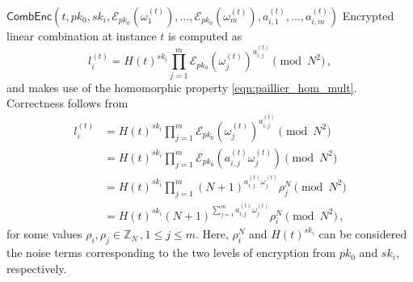 \documentclass[10pt,letterpaper,oneside,twocolumn,journal]{IEEEtran}
\theoremstyle{definition}
\theoremstyle{definition}
\theoremstyle{remark}
\newcommand\shrtdots{\!...}
\begin{document}
\begin{LaTeXdescription}
    \item[$\mathsf{CombEnc}(t, pk_0, sk_i, \mathcal{E}_{pk_0}(\omega_1^{(t)}),\shrtdots,\mathcal{E}_{pk_0}(\omega_m^{(t)}), a^{(t)}_{i,1},\shrtdots,a^{(t)}_{i,m})$] Encrypted linear combination at instance $t$ is computed as 
    \begin{equation}
        l^{(t)}_i = H(t)^{sk_i}\prod^{m}_{j=1}\mathcal{E}_{pk_0}(\omega^{(t)}_j)^{a^{(t)}_{i,j}} \pmod{N^2}\,,\label{eqn:our_scheme_lin_comb}
    \end{equation}
    and makes use of the homomorphic property \eqref{eqn:paillier_hom_mult}. Correctness follows from
    \begin{equation*}
        \begin{split}
             l^{(t)}_i &= H(t)^{sk_i}\prod^{m}_{j=1}\mathcal{E}_{pk_0}(\omega^{(t)}_j)^{a^{(t)}_{i,j}} \pmod{N^2} \\
            &= H(t)^{sk_i}\prod^{m}_{j=1}\mathcal{E}_{pk_0}(a^{(t)}_{i,j}\omega^{(t)}_j) \pmod{N^2} \\
            &= H(t)^{sk_i}\prod^{m}_{j=1}(N+1)^{a^{(t)}_{i,j}\omega^{(t)}_j} \rho^{N}_{j} \pmod{N^2} \\
            &= H(t)^{sk_i}(N+1)^{\sum^{m}_{j=1}a^{(t)}_{i,j}\omega^{(t)}_j} \rho_{i}^{N} \pmod{N^2}\,,
        \end{split}
    \end{equation*}
    for some values $\rho_i,\rho_j \in \mathbb{Z}_N\,,1\leq j \leq m$. Here, $\rho_i^N$ and $H(t)^{sk_i}$ can be considered the noise terms corresponding to the two levels of encryption from $pk_0$ and $sk_i$, respectively.


\end{LaTeXdescription}
\end{document}
